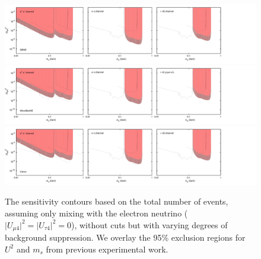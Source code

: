 \documentclass[11pt, a4paper]{article}
\begin{document}
\begin{figure}[t]
\center
\includegraphics[width=1.0\textwidth,clip,trim=0 20 300 15]{figures/sbnd_all_panels_ue4.pdf}
\includegraphics[width=1.0\textwidth,clip,trim=0 20 300 15]{figures/muboone_all_panels_ue4.pdf}
\includegraphics[width=1.0\textwidth,clip,trim=0 20 300 15]{figures/icarus_all_panels_ue4.pdf}

\caption{\label{fig:no_cuts_scaled_bkg_ue4_only}The sensitivity contours based on the total
	number of events, assuming only mixing with the electron neutrino ( $\vert U_{\mu 4}\vert^2=\vert U_{\tau 4}\vert^2=0$), without cuts but with varying degrees of background
suppression. We overlay the 95\% exclusion regions for $U^2$ and $m_s$ from
previous experimental work.}

\end{figure}
\end{document}
